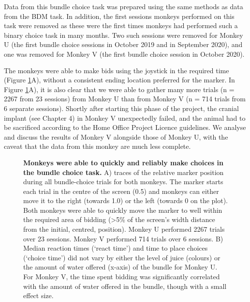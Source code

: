 Data from this bundle choice task was prepared using the same methods as data from the BDM task. In addition, the first sessions monkeys performed on this task were removed as these were the first times monkeys had performed such a binary choice task in many months. Two such sessions were removed for Monkey U (the first bundle choice sessions in October 2019 and in September 2020), and one was removed for Monkey V (the first bundle choice session in October 2020). 

The monkeys were able to make bids using the joystick in the required time (Figure \ref{fig:bundle_bidding}A), without a consistent ending location preferred for the marker. In Figure \ref{fig:bundle_bidding}A), it is also clear that we were able to gather many more trials (n = 2267 from 23 sessions) from Monkey U than from Monkey V (n = 714 trials from 6 separate sessions). Shortly after starting this phase of the project, the cranial implant (see Chapter 4) in Monkey V unexpectedly failed, and the animal had to be sacrificed according to the Home Office Project Licence guidelines. We analyse and discuss the results of Monkey V alongside those of Monkey U, with the caveat that the data from this monkey are much less complete.

\begin{figure}[htbp!] 
\centering    

\caption[Monkeys were able to quickly and reliably make choices in the bundle choice task.]{\textbf{Monkeys were able to quickly and reliably make choices in the bundle choice task.} A) traces of the relative marker position during all bundle-choice trials for both monkeys. The marker starts each trial in the centre of the screen (0.5) and monkeys can either move it to the right (towards 1.0) or the left (towards 0 on the plot). Both monkeys were able to quickly move the marker to well within the required area of bidding (>5\% of the screen’s width distance from the initial, centred, position). Monkey U performed 2267 trials over 23 sessions. Monkey V performed 714 trials over 6 sessions. B) Median reaction times (‘react time’) and time to place choices (‘choice time’) did not vary by either the level of juice (colours) or the amount of water offered (x-axis) of the bundle for Monkey U. For Monkey V, the time spent bidding was
significantly correlated with the amount of water offered in the bundle, though with a small effect size.}
\label{fig:bundle_bidding}
\end{figure}

